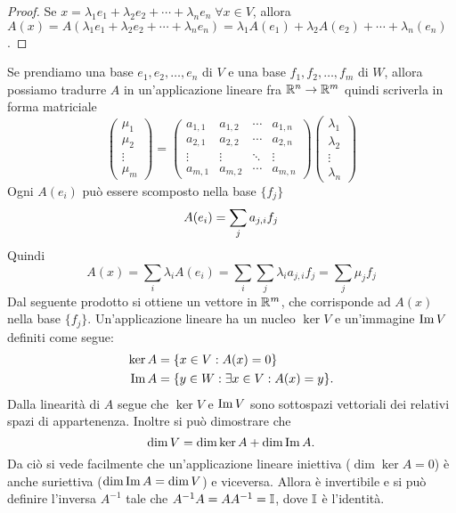 \begin{proof}
Se $x = \lambda_1 e_1 + \lambda_2 e_2 + \cdots + \lambda_n e_n \; \forall x \in V$, allora $A(x) = A(\lambda_1 e_1 + \lambda_2 e_2 + \cdots + \lambda_n e_n) = \lambda_1 A(e_1) + \lambda_2 A(e_2) + \cdots + \lambda_n (e_n)$.
\end{proof} 
Se prendiamo una base $e_1, e_2, \ldots, e_n$ di $V$ e una base $f_1, f_2, \ldots, f_m$ di $W$, allora possiamo tradurre $A$ in un'applicazione lineare fra $\mathbb R^n \rightarrow \mathbb R^m$ quindi scriverla in forma matriciale
\begin{equation*}
\begin{pmatrix}
\mu_1 \\
\mu_2 \\
\vdots \\
\mu_m
\end{pmatrix}
=
\begin{pmatrix}
a_{1,1} & a_{1,2} & \cdots & a_{1,n} \\
a_{2,1} & a_{2,2} & \cdots & a_{2,n} \\
\vdots  & \vdots  & \ddots & \vdots  \\
a_{m,1} & a_{m,2} & \cdots & a_{m,n}
\end{pmatrix}
\begin{pmatrix}
\lambda_1 \\
\lambda_2 \\
\vdots \\
\lambda_n
\end{pmatrix}
\end{equation*}
Ogni $A(e_i)$ può essere scomposto nella base $\{f_j\}$
\begin{equation*}
A(e_i) = \sum_j{a_{j,i} f_j} \\
\end{equation*}
Quindi
\begin{equation*}
A(x) = \sum_i{\lambda_i A(e_i)} = \sum_i\sum_j{\lambda_i a_{j,i} f_j} = \sum_j{\mu_j f_j}
\end{equation*}
Dal seguente prodotto si ottiene un vettore in $\mathbb R^m$, che corrisponde ad $A(x)$ nella base $\{f_j\}$. Un'applicazione lineare ha un nucleo $\ker{V}$ e un'immagine $\operatorname{Im}{V}$ definiti come segue:
\begin{align*}
\ker{A} &= \{x \in V : A(x) = 0\}\\
\operatorname{Im}{A} &= \{y \in W : \exists x \in V : A(x) = y\}.
\end{align*}
Dalla linearità di $A$ segue che $\ker{V}$ e $\operatorname{Im}{V}$ sono sottospazi vettoriali dei relativi spazi di appartenenza. Inoltre si può dimostrare che 
\begin{equation}\label{eq:dim}
\dim{V} = \dim{\ker{A}} + \dim{\operatorname{Im}{A}}.
\end{equation}
Da ciò si vede facilmente che un'applicazione lineare iniettiva ($\dim{\ker{A}} =0$) è anche suriettiva ($\dim{\operatorname{Im}{A}} = \dim{V}$) e viceversa. Allora è invertibile e si può definire l'inversa $A^{-1}$ tale che $A^{-1} A = A A^{-1} = \mathbb{I}$, dove $\mathbb{I}$ è l'identità. 

